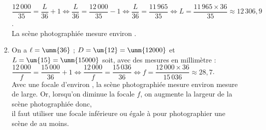 \begin{corrige}
\begin{enumerate}
\begin{enumerate}
               $\dfrac{12\,000}{35} =\dfrac{L}{36}+1 \iff \dfrac{L}{36} =\dfrac{12\,000}{35}-1 \iff \dfrac{L}{36} =\dfrac{11\,965}{35} \iff L =\dfrac{11\,965\times36}{35} \approx 12\,306,9$. \\ [1mm]
               {\blue La scène photographiée mesure environ }.
            \item On a $\ell =\umm{36}$ ; $D =\um{12} =\umm{12000}$ et $L =\um{15} =\umm{15000}$ soit, avec des mesures en millimètre : \\ [1mm]
               $\dfrac{12\,000}{f} =\dfrac{15\,000}{36}+1 \iff \dfrac{12\,000}{f}  =\dfrac{15\,036}{36} \iff f =\dfrac{12\,000\times36}{15\,036} \approx 28,7$. \\ [1mm]
               Avec une focale d'environ , la scène photographiée mesure environ mesure  de large. Or, lorsqu'on diminue la focale $f$, on augmente la largeur de la scène photographiée donc, \\
               {\blue il faut utiliser une focale inférieure ou égale à  pour photographier une scène de  au moins}.
         \end{enumerate}
   \end{enumerate}
\end{corrige}

\bigskip


